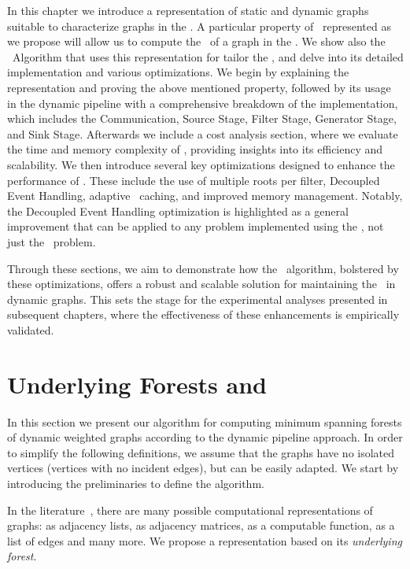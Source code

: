 In this chapter we introduce a representation of static and dynamic graphs suitable to characterize graphs in the \dpm. 
A particular property of \msts\ represented as we propose will allow us to compute the \mst\ of a graph in the \dpm. 
We show also the \DPmst\ Algorithm that uses this representation for tailor the \dpm, and delve into its detailed 
implementation and various optimizations. 
We begin by explaining the representation and proving the above mentioned property, 
followed by its usage in the dynamic pipeline with a comprehensive breakdown of the implementation, 
which includes the Communication, Source Stage, Filter Stage, Generator Stage, and Sink Stage.
Afterwards we include a cost analysis section, where we evaluate the time and memory complexity of \DPmst, 
providing insights into its efficiency and scalability.
We then introduce several key optimizations designed to enhance the performance of \DPmst. 
These include the use of multiple roots per filter, Decoupled Event Handling, adaptive \mst\ caching, and improved memory management. Notably, the Decoupled Event Handling optimization is highlighted as a general improvement that can be applied to any problem implemented using the \dpm, not just the \mst\ problem.

Through these sections, we aim to demonstrate how the \DPmst\ algorithm, bolstered by these optimizations, offers a robust and scalable solution for maintaining the \mst\ in dynamic graphs. This sets the stage for the experimental analyses presented in subsequent chapters, where the effectiveness of these enhancements is empirically validated.

\section{Underlying Forests and \msts}
In this section we present our algorithm for computing minimum spanning forests of dynamic 
weighted graphs according to the dynamic pipeline approach. 
In order to simplify the following definitions, we assume that the graphs have no isolated vertices (vertices with no incident edges), 
but can be easily adapted. We start by introducing the preliminaries to define the algorithm. 

In the literature~\cite{Cormen4thEdition}, there are many possible computational representations of graphs: 
as adjacency lists, as adjacency matrices, as a computable function, as a list of edges and many more. 
We propose a representation based on its \emph{underlying forest}.

